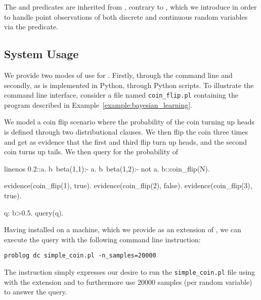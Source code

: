 The  and  predicates are inherited from \problogsty, contrary to , which we introduce in order to handle point observations of both discrete and continuous random variables via the  predicate.








\subsection{System Usage}
\label{sec:usage}

We provide two modes of use for \dcproblogsys. Firstly, through the command line  and secondly, as \dcproblogsys is implemented in Python, through Python scripts. To illustrate the command line interface, consider a file named \texttt{coin_flip.pl} containing the program described in Example~\ref{example:bayesian_learning}.

\begin{example}\label{example:bayesian_learning}
	We model a coin flip scenario where the probability of the coin turning up heads is defined through two distributional clauses. We then flip the coin three times and get as evidence that the first and third flip turn up heads, and the second coin turns up tails. We then query for the probability of 
	\begin{problog*}{linenos}
0.2::a.
b~beta(1,1):- a.
b~beta(1,2):- not a.
b::coin_flip(N).

evidence(coin_flip(1), true).
evidence(coin_flip(2), false).
evidence(coin_flip(3), true).

q: b>0.5.
query(q).
	\end{problog*}
\end{example}
Having \dcproblogsys installed on a machine, which we provide as an extension of \problogsys, we can execute the query with the following command line instruction:
\begin{verbatim}
problog dc simple_coin.pl -n_samples=20000
\end{verbatim}
The instruction simply expresses our desire to run the \texttt{simple_coin.pl} file using \problogsys with the \dcproblogsys extension and to furthermore use $20000$ samples (per random variable) to answer the query.

